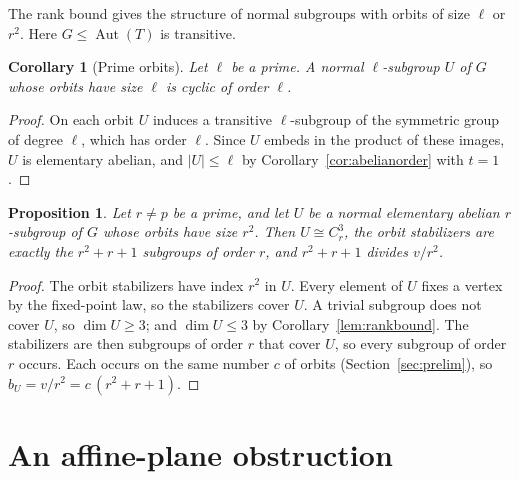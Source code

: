 \documentclass[11pt]{amsart}
\newtheorem{proposition}[theorem]{Proposition}
\newtheorem{corollary}[theorem]{Corollary}
\theoremstyle{definition}
\theoremstyle{remark}
\newcommand{\Aut}{\operatorname{Aut}}
\begin{document}
The rank bound gives the structure of normal subgroups with orbits of size $\ell$ or $r^2$. Here $G\le\Aut(T)$ is transitive.

\begin{corollary}[Prime orbits]\label{lem:prime-orbit}
Let $\ell$ be a prime. A normal $\ell$-subgroup $U$ of $G$ whose orbits have size $\ell$ is cyclic of order $\ell$.
\end{corollary}
\begin{proof}
On each orbit $U$ induces a transitive $\ell$-subgroup of the symmetric group of degree $\ell$, which has order $\ell$. Since $U$ embeds in the product of these images, $U$ is elementary abelian, and $|U|\le\ell$ by Corollary~\ref{cor:abelianorder} with $t=1$.
\end{proof}

\begin{proposition}\label{prop:r-structure}
Let $r\ne p$ be a prime, and let $U$ be a normal elementary abelian $r$-subgroup of $G$ whose orbits have size $r^2$. Then $U\cong C_r^3$, the orbit stabilizers are exactly the $r^2+r+1$ subgroups of order $r$, and $r^2+r+1$ divides $v/r^2$.
\end{proposition}
\begin{proof}
The orbit stabilizers have index $r^2$ in $U$. Every element of $U$ fixes a vertex by the fixed-point law, so the stabilizers cover $U$. A trivial subgroup does not cover $U$, so $\dim U\ge3$; and $\dim U\le3$ by Corollary~\ref{lem:rankbound}. The stabilizers are then subgroups of order $r$ that cover $U$, so every subgroup of order $r$ occurs. Each occurs on the same number $c$ of orbits (Section~\ref{sec:prelim}), so $b_U=v/r^2=c\,(r^2+r+1)$.
\end{proof}

\section{An affine-plane obstruction}\label{sec:plane}
\end{document}
